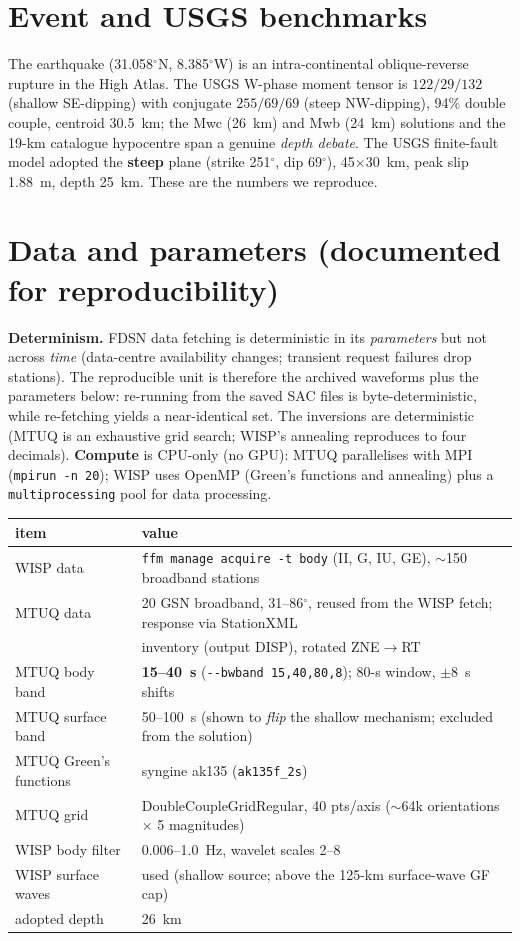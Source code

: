\documentclass[11pt]{article}
\begin{document}
\section{Event and USGS benchmarks}
The earthquake (31.058$^\circ$N, 8.385$^\circ$W) is an intra-continental oblique-reverse rupture
in the High Atlas. The USGS W-phase moment tensor is $122/29/132$ (shallow SE-dipping) with
conjugate $255/69/69$ (steep NW-dipping), 94\% double couple, centroid 30.5~km; the Mwc (26~km)
and Mwb (24~km) solutions and the 19-km catalogue hypocentre span a genuine \emph{depth debate}.
The USGS finite-fault model adopted the \textbf{steep} plane (strike 251$^\circ$, dip 69$^\circ$),
45$\times$30~km, peak slip 1.88~m, depth 25~km. These are the numbers we reproduce.

\section{Data and parameters (documented for reproducibility)}
\textbf{Determinism.} FDSN data fetching is deterministic in its \emph{parameters} but not across
\emph{time} (data-centre availability changes; transient request failures drop stations). The
reproducible unit is therefore the archived waveforms plus the parameters below: re-running from
the saved SAC files is byte-deterministic, while re-fetching yields a near-identical set. The
inversions are deterministic (MTUQ is an exhaustive grid search; WISP's annealing reproduces to
four decimals). \textbf{Compute} is CPU-only (no GPU): MTUQ parallelises with MPI
(\texttt{mpirun -n 20}); WISP uses OpenMP (Green's functions and annealing) plus a
\texttt{multiprocessing} pool for data processing.

\begin{table}[H]\centering\small
\begin{tabular}{ll}
\toprule
item & value \\
\midrule
WISP data & \texttt{ffm manage acquire -t body} (II, G, IU, GE), $\sim$150 broadband stations \\
MTUQ data & 20 GSN broadband, 31--86$^\circ$, reused from the WISP fetch; response via StationXML \\
 & inventory (output DISP), rotated ZNE$\to$RT \\
MTUQ body band & \textbf{15--40~s} (\texttt{-{}-bwband 15,40,80,8}); 80-s window, $\pm$8~s shifts \\
MTUQ surface band & 50--100~s (shown to \emph{flip} the shallow mechanism; excluded from the solution) \\
MTUQ Green's functions & syngine ak135 (\texttt{ak135f\_2s}) \\
MTUQ grid & DoubleCoupleGridRegular, 40 pts/axis ($\sim$64k orientations $\times$ 5 magnitudes) \\
WISP body filter & 0.006--1.0~Hz, wavelet scales 2--8 \\
WISP surface waves & used (shallow source; above the 125-km surface-wave GF cap) \\
adopted depth & 26~km \\
\bottomrule
\end{tabular}
\end{table}
\end{document}
